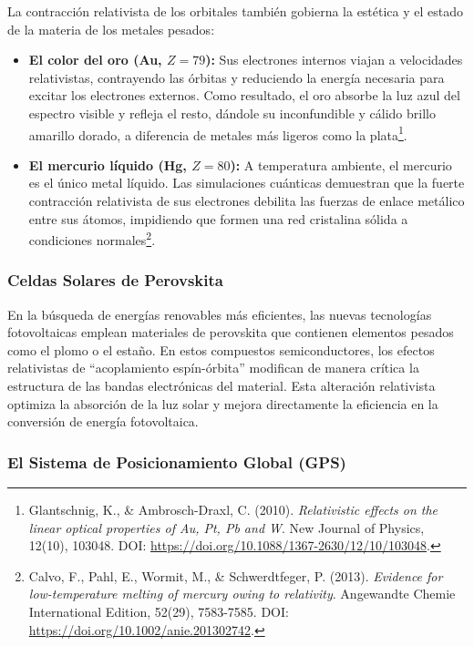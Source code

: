 \documentclass[11pt,a4paper]{book}
\begin{document}
La contracción relativista de los orbitales también gobierna la estética y el estado de la materia de los metales pesados:
\begin{itemize}
    \item \textbf{El color del oro (Au, $Z=79$):} Sus electrones internos viajan a velocidades relativistas, contrayendo las órbitas y reduciendo la energía necesaria para excitar los electrones externos. Como resultado, el oro absorbe la luz azul del espectro visible y refleja el resto, dándole su inconfundible y cálido brillo amarillo dorado, a diferencia de metales más ligeros como la plata\footnote{Glantschnig, K., \& Ambrosch-Draxl, C. (2010). \textit{Relativistic effects on the linear optical properties of Au, Pt, Pb and W}. New Journal of Physics, 12(10), 103048. DOI: \url{https://doi.org/10.1088/1367-2630/12/10/103048}.}.
    \item \textbf{El mercurio líquido (Hg, $Z=80$):} A temperatura ambiente, el mercurio es el único metal líquido. Las simulaciones cuánticas demuestran que la fuerte contracción relativista de sus electrones debilita las fuerzas de enlace metálico entre sus átomos, impidiendo que formen una red cristalina sólida a condiciones normales\footnote{Calvo, F., Pahl, E., Wormit, M., \& Schwerdtfeger, P. (2013). \textit{Evidence for low-temperature melting of mercury owing to relativity}. Angewandte Chemie International Edition, 52(29), 7583-7585. DOI: \url{https://doi.org/10.1002/anie.201302742}.}.
\end{itemize}

\subsubsection{Celdas Solares de Perovskita}

En la búsqueda de energías renovables más eficientes, las nuevas tecnologías fotovoltaicas emplean materiales de perovskita que contienen elementos pesados como el plomo o el estaño. En estos compuestos semiconductores, los efectos relativistas de ``acoplamiento espín-órbita'' modifican de manera crítica la estructura de las bandas electrónicas del material. Esta alteración relativista optimiza la absorción de la luz solar y mejora directamente la eficiencia en la conversión de energía fotovoltaica.

\subsubsection{El Sistema de Posicionamiento Global (GPS)}
\end{document}
